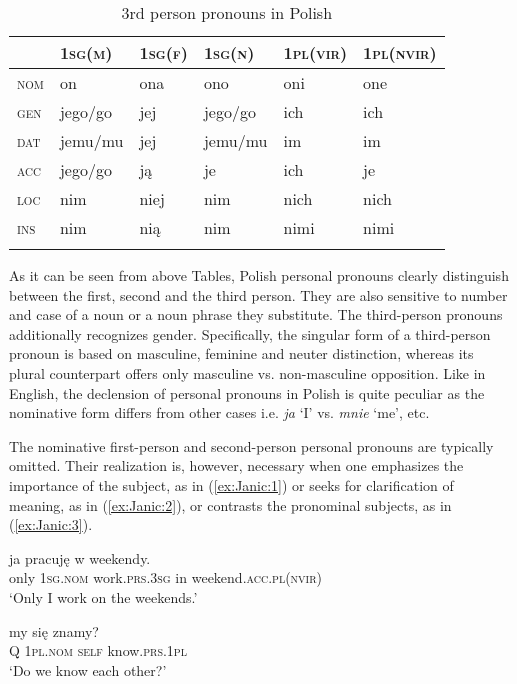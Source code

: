 \documentclass[output=paper]{langscibook}
\begin{document}
\begin{table}%
 \begin{tabularx}{\textwidth}{p{1cm}p{1.7cm}p{1.7cm}p{1.7cm}p{1.7cm}p{1.7cm}}
 \lsptoprule
 & \textsc{1sg(m)} & \textsc{1sg(f)} & \textsc{1sg(n)} & \textsc{1pl(vir)} & \textsc{1pl(nvir)}\\
 \midrule
 \textsc{nom}	& on & ona	& ono & oni	 & one\\
 \textsc{gen} & jego/go &	jej	& jego/go	& ich & ich \\
 \textsc{dat}	& jemu/mu &	jej	& jemu/mu	& im	 & im\\
 \textsc{acc}	& jego/go	 & ją	& je	 & ich	 & je\\
 \textsc{loc}	& nim	& niej &	nim & nich & nich\\
 \textsc{ins}	& nim	 & nią	& nim	 & nimi &	nimi\\
 \lspbottomrule
 \end{tabularx}
 \caption{3rd person pronouns in Polish}
 \label{tab:Janic:2}
\end{table}
 

As it can be seen from above Tables, Polish personal pronouns clearly distinguish between the first, second and the third person. They are also sensitive to number and case of a noun or a noun phrase they substitute. The third-person pronouns additionally recognizes gender. Specifically, the singular form of a third-person pronoun is based on masculine, feminine and neuter distinction, whereas its plural counterpart offers only masculine vs. non-masculine opposition. Like in English, the declension of personal pronouns in Polish is quite peculiar as the nominative form differs from other cases i.e. \textit{ja} ‘I’ vs. \textit{mnie} ‘me’, etc.

The nominative first-person and second-person personal pronouns are typically omitted. Their realization is, however, necessary when one emphasizes the importance of the subject, as in (\ref{ex:Janic:1}) or seeks for clarification of meaning, as in (\ref{ex:Janic:2}), or contrasts the pronominal subjects, as in (\ref{ex:Janic:3}).

\ea
 \label{ex:Janic:1}
  {ja} {pracuję}	{w} {weekendy.}{\footnotemark}\\
	 only \textsc{1sg.nom} work.\textsc{prs.3sg}	in weekend.\textsc{acc.pl(nvir)}\\
	\glt ‘Only I work on the weekends.’
\z
	
\ea
 \label{ex:Janic:2}
 	{my} {się}	{znamy?}\\
	 Q	\textsc{1pl.nom} \textsc{self} know.\textsc{prs.1pl}\\
	\glt ‘Do we know each other?’ \citep[267]{Sadowska2012} 
\z
\end{document}
